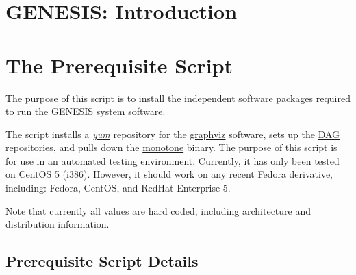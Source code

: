 \documentclass[12pt]{article}
\begin{document}
\section*{GENESIS: Introduction}

\section*{The Prerequisite Script}

The purpose of this script is to install the independent software packages required to run the GENESIS system software.

The script installs a \href{http://www.centos.org/docs/5/html/yum/}{\it yum} repository for the \href{http://www.graphviz.org/}{graphviz} software, sets up the \href{http://dag.wieers.com/rpm/}{DAG} repositories, and pulls down the \href{http://monotone.ca/}{monotone} binary. The purpose of this script is for use in an automated testing environment. Currently, it has only been tested on CentOS 5 (i386). However, it should work on any recent Fedora derivative, including: Fedora, CentOS, and RedHat Enterprise 5.

Note that currently all values are hard coded, including architecture and distribution information.

\subsection{Prerequisite Script Details}
\end{document}
